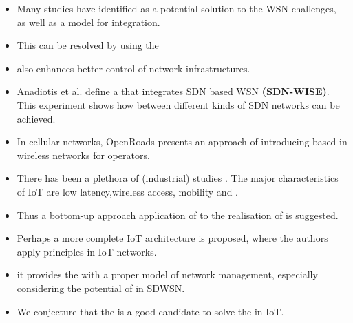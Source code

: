 \begin{itemize}
	\item[\cite{qin_software_2014}] Many studies have identified  as a potential solution to the WSN challenges,
	as well as a model for  integration.
	\item[\cite{qin_software_2014}] This  can be resolved by using the 
	\item[\cite{kobo_survey_2017}]  also enhances better control of  network infrastructures.
	\item[\cite{kobo_survey_2017}] Anadiotis et al. define a  that integrates SDN based WSN \textbf{(SDN-WISE)}.
		This experiment shows how  between different kinds of SDN networks can be achieved.
	\item[\cite{kobo_survey_2017}] In cellular networks,
		OpenRoads presents an approach of introducing  based  in wireless networks for operators.
	\item[\cite{ndiaye_software_2017}] There has been a plethora of (industrial) studies .
			The major characteristics of IoT are low latency,wireless access, mobility and .
	\item[\cite{ndiaye_software_2017}] Thus a bottom-up approach application of  to the realisation of  is suggested.
	\item[\cite{ndiaye_software_2017}] Perhaps a more complete IoT architecture is proposed,
			where the authors apply  principles in IoT  networks.
	\item[\cite{bera_softwaredefined_2017}] it provides the  with a proper model of network management,
			especially considering the potential of  in SDWSN.
	\item[\cite{bera_softwaredefined_2017}] We conjecture that the  is a good candidate to solve the  in IoT.
\end{itemize}


